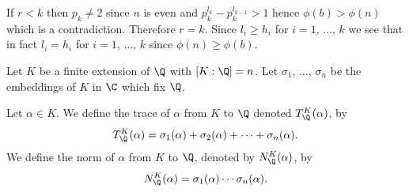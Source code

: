 If $r<k$ then $p_k\neq2$ since $n$ is even and $p_k^{l_k}-p_k^{l_{k-1}}>1$ hence $\phi(b)>\phi(n)$ which is a contradiction.  Therefore $r=k$.  Since $l_i\geq h_i$ for $i=1$, $\dotsc$, $k$ we see that in fact $l_i=h_i$ for $i=1$, $\dotsc$, $k$ since $\phi(n)\geq\phi(b)$.

Let $K$ be a finite extension of $\Q$ with $[K:\Q]=n$.  Let $\sigma_1$, $\dotsc$, $\sigma_n$ be the embeddings of $K$ in $\C$ which fix $\Q$.

Let $\alpha\in K$.  We define the trace of $\alpha$ from $K$ to $\Q$ denoted $T_\Q^K(\alpha)$, by
\[ T_\Q^K(\alpha) = \sigma_1(\alpha) + \sigma_2(\alpha) + \dotsb + \sigma_n(\alpha) . \]
We define the norm of $\alpha$ from $K$ to $\Q$, denoted by $N_\Q^K(\alpha)$, by 
\[ N_\Q^K(\alpha) = \sigma_1(\alpha)\dotsm\sigma_n(\alpha) . \]
